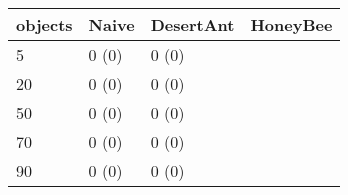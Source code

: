 \begin{tabular} {|l|l|l|l|}
\hline
objects & Naive & DesertAnt & HoneyBee \\
\hline
5 & 0 (0)  & 0 (0)  &  \\
20 & 0 (0)  & 0 (0)  &  \\
50 & 0 (0)  & 0 (0)  &  \\
70 & 0 (0)  & 0 (0)  &  \\
90 & 0 (0)  & 0 (0)  &  \\
\hline
\end{tabular}

